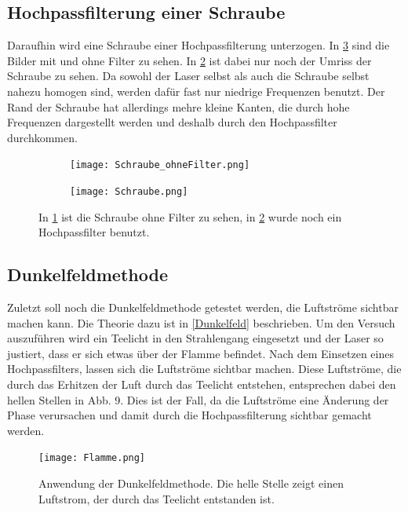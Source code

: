 \newpage

\subsection{Hochpassfilterung einer Schraube}
Daraufhin wird eine Schraube einer Hochpassfilterung unterzogen. In \cref{Schraube} sind die Bilder mit und ohne Filter zu sehen. In \cref{fig:Schraube_Filter} ist dabei nur noch der Umriss der Schraube zu sehen. Da sowohl der Laser selbst als auch die Schraube selbst nahezu homogen sind, werden dafür fast nur niedrige Frequenzen benutzt. Der Rand der Schraube hat allerdings mehre kleine Kanten, die durch hohe Frequenzen dargestellt werden und deshalb durch den Hochpassfilter durchkommen.

\begin{figure}[h]
	\begin{subfigure}[c]{0.5\textwidth}
		
		\texttt{[image: Schraube\_ohneFilter.png]}
		\caption{}
		\label{fig:Schraube}
		
	\end{subfigure}
	\begin{subfigure}[c]{0.5\textwidth}
		\texttt{[image: Schraube.png]}
		\caption{}
		\label{fig:Schraube_Filter}
	\end{subfigure}
	\caption{In \cref{fig:Schraube} ist die Schraube ohne Filter zu sehen, in \cref{fig:Schraube_Filter} wurde noch ein Hochpassfilter benutzt.}
	\label{Schraube}
\end{figure}  


\newpage

\subsection{Dunkelfeldmethode}
Zuletzt soll noch die Dunkelfeldmethode getestet werden, die Luftströme sichtbar machen
kann. Die Theorie dazu ist in \cref{Dunkelfeld} beschrieben. Um den Versuch auszuführen wird ein Teelicht in den Strahlengang eingesetzt und der Laser so justiert,
dass er sich etwas über der Flamme befindet. Nach dem Einsetzen eines Hochpassfilters,
lassen sich die Luftströme sichtbar machen. Diese Luftströme, die durch das Erhitzen der
Luft durch das Teelicht entstehen, entsprechen dabei den hellen Stellen in Abb. 9. Dies
ist der Fall, da die Luftströme eine Änderung der Phase verursachen und damit durch
die Hochpassfilterung sichtbar gemacht werden.

\begin{figure}[h!]
	\centering
	\texttt{[image: Flamme.png]}
	\caption{Anwendung der Dunkelfeldmethode. Die helle Stelle zeigt einen Luftstrom, der
		durch das Teelicht entstanden ist.}
	\label{Flamme}
\end{figure}


